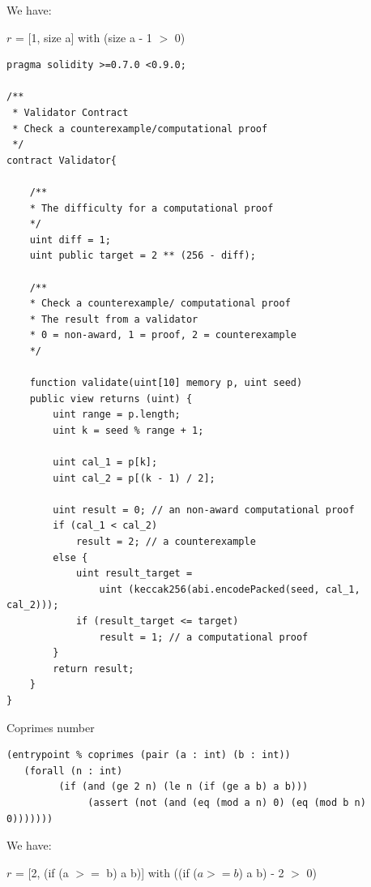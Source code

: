 \documentclass[runningheads]{llncs}
\begin{document}
\noindent We have:

$r$ = [1, size a] with (size a - 1 $>$ 0)


\begin{lstlisting}[numbers=none]
pragma solidity >=0.7.0 <0.9.0;

/**
 * Validator Contract
 * Check a counterexample/computational proof
 */
contract Validator{

    /**
    * The difficulty for a computational proof
    */
    uint diff = 1;
    uint public target = 2 ** (256 - diff); 

    /**
    * Check a counterexample/ computational proof
    * The result from a validator
    * 0 = non-award, 1 = proof, 2 = counterexample
    */

    function validate(uint[10] memory p, uint seed) 
    public view returns (uint) {
        uint range = p.length; 
        uint k = seed % range + 1;

        uint cal_1 = p[k];
        uint cal_2 = p[(k - 1) / 2];

        uint result = 0; // an non-award computational proof 
        if (cal_1 < cal_2)  
            result = 2; // a counterexample
        else {
            uint result_target = 
                uint (keccak256(abi.encodePacked(seed, cal_1, cal_2)));
            if (result_target <= target) 
                result = 1; // a computational proof      
        }              
        return result;           
    }
}

\end{lstlisting}

Coprimes number

\begin{lstlisting}[numbers=none]
(entrypoint % coprimes (pair (a : int) (b : int))
   (forall (n : int)
         (if (and (ge 2 n) (le n (if (ge a b) a b)))
              (assert (not (and (eq (mod a n) 0) (eq (mod b n) 0)))))))
\end{lstlisting}


\noindent We have:

$r$ = [2, (if (a $>=$ b) a b)] with ((if ($a >= b$) a b) - 2 $>$ 0)
\end{document}
